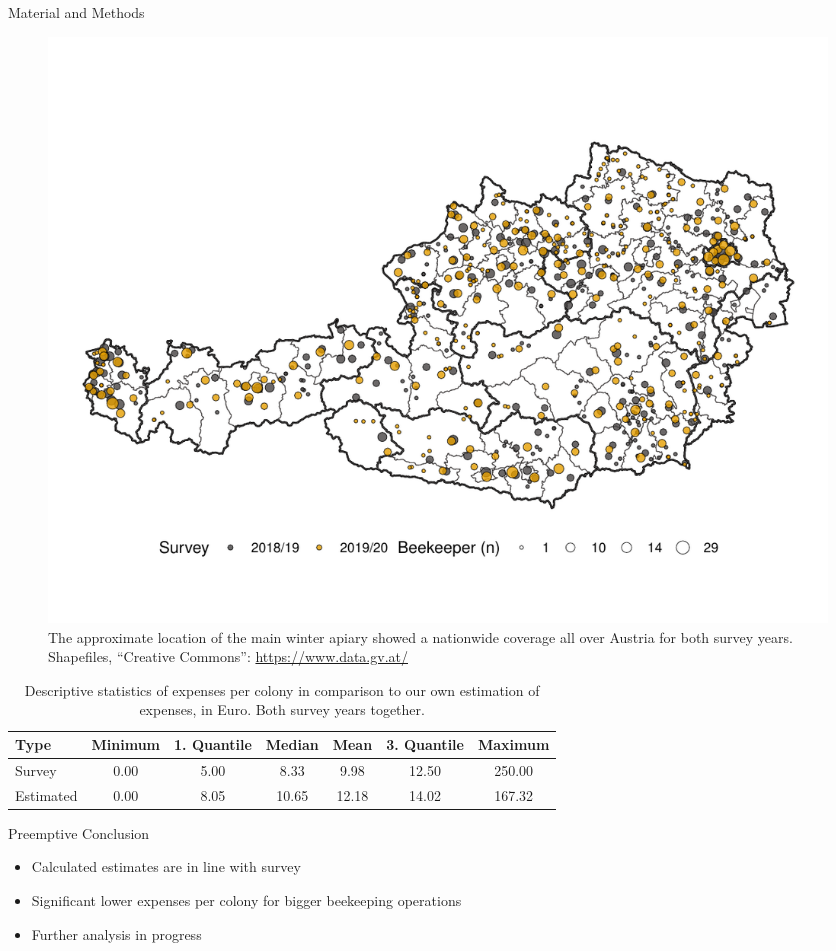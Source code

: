 \documentclass{beamer}
\begin{document}
\begin{frame}{}
\begin{columns}[t]
\begin{column}{0.49\textwidth}
\begin{block}{Material and Methods}
      \begin{figure} 
        \centering
        \includegraphics[width=.85\textwidth]{img/map.pdf}
        \caption{The approximate location of the main winter apiary showed a nationwide coverage all over Austria for both survey years. Shapefiles, \enquote{Creative Commons}: \url{https://www.data.gv.at/}}
      \end{figure}
      
            \hrulefill
      \vspace{15pt}
      \begin{table}
        \centering
        \caption{Descriptive statistics of expenses per colony in comparison to our own estimation of expenses, in Euro. Both survey years together.}
        \begin{tabular}[]{l*{6}{S[table-format=4.4]}}
          \toprule
          Type & {Minimum} & {1. Quantile} & {Median} & {Mean} & {3. Quantile} & {Maximum}\tabularnewline
          \midrule
          Survey & 0.00 & 5.00 & 8.33 & 9.98 & 12.50 & 250.00 \tabularnewline
          Estimated & 0.00 & 8.05 & 10.65 & 12.18 & 14.02 & 167.32 \tabularnewline
          \bottomrule
        \end{tabular}
      \end{table}
      \vspace{15pt}
      
    \end{block}
    
    {
      \begin{block}{Preemptive Conclusion}
         \setlength{\leftmargini}{95pt}
          \begin{itemize}
          \setlength{\itemindent}{-30pt}
          \LARGE
          \item Calculated estimates are in line with survey
          \item Significant lower expenses per colony for bigger beekeeping operations
          \item Further analysis in progress
        \end{itemize}
      \end{block}
    }


\end{column}
\end{columns}
\end{frame}
\end{document}
